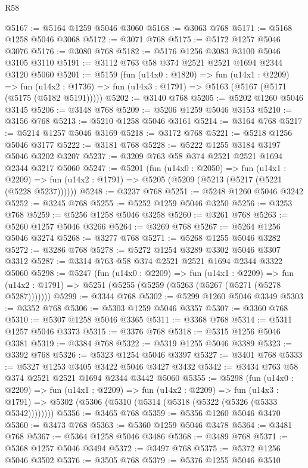 \begin{lexlean}{R58}
\begin{coremodule}
@5167 := @5164 @1259 @5046 @3060
@5168 := @3063 @768
@5171 := @5168 @1258 @5046 @3068
@5172 := @3071 @768
@5175 := @5172 @1257 @5046 @3076
@5176 := @3080 @768
@5182 := @5176 @1256 @3083 @3100 @5046 @3105 @3110
@5191 := @3112 @763 @58 @374 @2521 @2521 @1694 @2344 @3120 @5060
@5201 := @5159
    (fun (u14x0 : @1820) =>
    fun (u14x1 : @2209) =>
    fun (u14x2 : @1736) => fun (u14x3 : @1791) => @5163 (@5167 (@5171 (@5175 (@5182 @5191)))))
@5202 := @3140 @768
@5205 := @5202 @1260 @5046 @3145
@5206 := @3148 @768
@5209 := @5206 @1259 @5046 @3153
@5210 := @3156 @768
@5213 := @5210 @1258 @5046 @3161
@5214 := @3164 @768
@5217 := @5214 @1257 @5046 @3169
@5218 := @3172 @768
@5221 := @5218 @1256 @5046 @3177
@5222 := @3181 @768
@5228 := @5222 @1255 @3184 @3197 @5046 @3202 @3207
@5237 := @3209 @763 @58 @374 @2521 @2521 @1694 @2344 @3217 @5060
@5247 := @5201
    (fun (u14x0 : @2050) =>
    fun (u14x1 : @2209) =>
    fun (u14x2 : @1791) => @5205 (@5209 (@5213 (@5217 (@5221 (@5228 @5237))))))
@5248 := @3237 @768
@5251 := @5248 @1260 @5046 @3242
@5252 := @3245 @768
@5255 := @5252 @1259 @5046 @3250
@5256 := @3253 @768
@5259 := @5256 @1258 @5046 @3258
@5260 := @3261 @768
@5263 := @5260 @1257 @5046 @3266
@5264 := @3269 @768
@5267 := @5264 @1256 @5046 @3274
@5268 := @3277 @768
@5271 := @5268 @1255 @5046 @3282
@5272 := @3286 @768
@5278 := @5272 @1254 @3289 @3302 @5046 @3307 @3312
@5287 := @3314 @763 @58 @374 @2521 @2521 @1694 @2344 @3322 @5060
@5298 := @5247
    (fun (u14x0 : @2209) =>
    fun (u14x1 : @2209) =>
    fun (u14x2 : @1791) => @5251 (@5255 (@5259 (@5263 (@5267 (@5271 (@5278 @5287)))))))
@5299 := @3344 @768
@5302 := @5299 @1260 @5046 @3349
@5303 := @3352 @768
@5306 := @5303 @1259 @5046 @3357
@5307 := @3360 @768
@5310 := @5307 @1258 @5046 @3365
@5311 := @3368 @768
@5314 := @5311 @1257 @5046 @3373
@5315 := @3376 @768
@5318 := @5315 @1256 @5046 @3381
@5319 := @3384 @768
@5322 := @5319 @1255 @5046 @3389
@5323 := @3392 @768
@5326 := @5323 @1254 @5046 @3397
@5327 := @3401 @768
@5333 := @5327 @1253 @3405 @3422 @5046 @3427 @3432
@5342 := @3434 @763 @58 @374 @2521 @2521 @1694 @2344 @3442 @5060
@5355 := @5298
    (fun (u14x0 : @2209) =>
    fun (u14x1 : @2209) =>
    fun (u14x2 : @2209) =>
    fun (u14x3 : @1791) => @5302 (@5306 (@5310 (@5314 (@5318 (@5322 (@5326 (@5333 @5342))))))))
@5356 := @3465 @768
@5359 := @5356 @1260 @5046 @3470
@5360 := @3473 @768
@5363 := @5360 @1259 @5046 @3478
@5364 := @3481 @768
@5367 := @5364 @1258 @5046 @3486
@5368 := @3489 @768
@5371 := @5368 @1257 @5046 @3494
@5372 := @3497 @768
@5375 := @5372 @1256 @5046 @3502
@5376 := @3505 @768
@5379 := @5376 @1255 @5046 @3510

\end{coremodule}
\end{lexlean}
